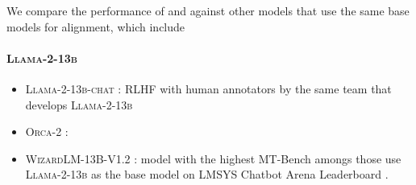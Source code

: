 We compare the performance of \textsc{\labl} and \textsc{\labm} against other models that use the same base models for alignment, which include
\paragraph{\textsc{Llama-2-13b}}
\begin{itemize}
    \item \textsc{Llama-2-13b-chat} \citep{touvron2023llama}: RLHF with human annotators by the same team that develops \textsc{Llama-2-13b}
    \item \textsc{Orca-2} \citep{mitra2023orcateaching}: 
    \item \textsc{WizardLM-13B-V1.2} \citep{xu2023wizardlmempowering}: model with the highest MT-Bench amongs those use \textsc{Llama-2-13b} as the base model on LMSYS Chatbot Arena Leaderboard \citep{mtbench}.
\end{itemize}
